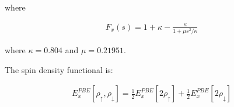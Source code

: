 where

\begin{equation}
\begin{split}
F_x(s) = 1 + \kappa - \frac{\kappa}{1 + \mu s^2 / \kappa}
\end{split}
\label{eq:functional9}
\end{equation}

where $\kappa = 0.804$ and $\mu = 0.21951$.

The spin density functional is:

\begin{equation}
\begin{split}
E_{x}^{PBE} [\rho_{\uparrow}, \rho_{\downarrow}] = \frac{1}{2} E_{x}^{PBE} [2 \rho_{\uparrow}] + \frac{1}{2} E_{x}^{PBE} [2 \rho_{\downarrow}]
\end{split}
\label{eq:functional9}
\end{equation}


